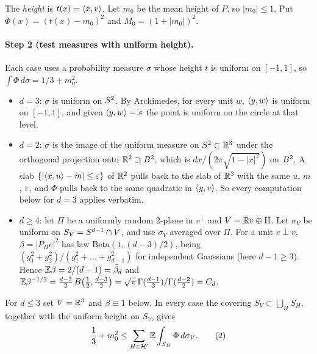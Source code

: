 The \emph{height} is $t(x) = \langle x,v\rangle$. Let $m_0$ be the mean height of $P$, so $|m_0| \le 1$.
Put $\Phi(x) = (t(x) - m_0)^2$ and $M_0 = (1 + |m_0|)^2$.

\paragraph{Step 2 (test measures with uniform height).} Each case uses a probability measure
$\sigma$ whose height $t$ is uniform on $[-1, 1]$, so $\int \Phi \, d\sigma = 1/3 + m_0^2$.
\begin{itemize}
  \item $d = 3$: $\sigma$ is uniform on $S^2$. By Archimedes, for every unit $w$,
    $\langle y,w\rangle$ is uniform on $[-1, 1]$, and given $\langle y,w\rangle = s$ the point is uniform on the
    circle at that level.
  \item $d = 2$: $\sigma$ is the image of the uniform measure on $S^2 \subset \mathbb{R}^3$ under the
    orthogonal projection onto $\mathbb{R}^2 \supset B^2$, which is
    $dx / (2\pi\sqrt{1 - |x|^2})$ on $B^2$. A slab $\{|\langle x,u\rangle - m| \le \varepsilon\}$ of $\mathbb{R}^2$
    pulls back to the slab of $\mathbb{R}^3$ with the same $u$, $m$, $\varepsilon$, and $\Phi$ pulls back to
    the same quadratic in $\langle y,v\rangle$. So every computation below for $d = 3$ applies verbatim.
  \item $d \ge 4$: let $\Pi$ be a uniformly random $2$-plane in $v^\perp$ and
    $V = \mathbb{R} v \oplus \Pi$. Let $\sigma_V$ be uniform on $S_V = S^{d-1} \cap V$, and use
    $\sigma_V$ averaged over $\Pi$. For a unit $e \perp v$, $\beta = |P_\Pi e|^2$ has law
    $\mathrm{Beta}(1, (d-3)/2)$, being $(g_1^2 + g_2^2)/(g_1^2 + \dots + g_{d-1}^2)$ for
    independent Gaussians (here $d - 1 \ge 3$). Hence
    $\mathbb{E}\beta = 2/(d-1) = \bar\beta_d$ and
    $\mathbb{E}\beta^{-1/2} = \frac{d-3}{2}\, B\bigl(\frac12, \frac{d-3}{2}\bigr)
    = \sqrt\pi\,\Gamma(\frac{d-1}2)/\Gamma(\frac{d-2}2) = C_d$.
\end{itemize}
For $d \le 3$ set $V = \mathbb{R}^3$ and $\beta \equiv 1$ below. In every case the covering
$S_V \subset \bigcup_H S_H$, together with the uniform height on $S_V$, gives
\begin{equation}\label{eq:A-unified-2}
  \frac13 + m_0^2 \le \sum_{H \in \mathcal{H}'} \mathbb{E} \int_{S_H} \Phi \, d\sigma_V. \tag{2}
\end{equation}

